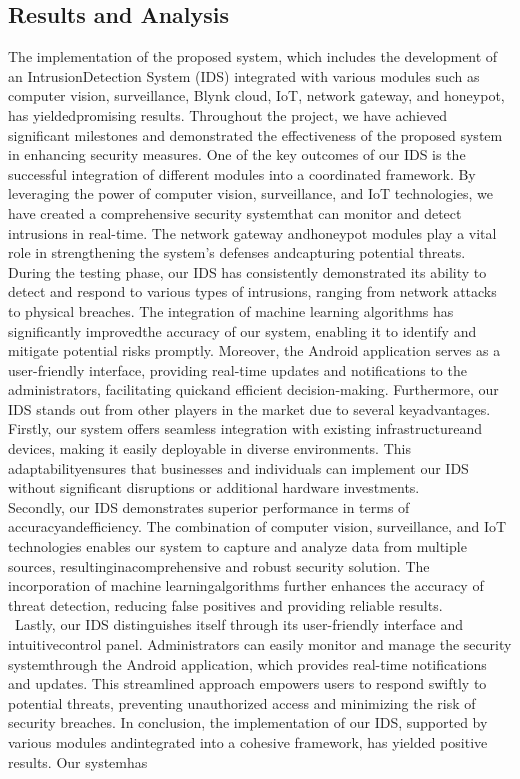 \documentclass[letterpaper, 10 pt, conference]{ieeeconf}  %
\begin{document}
\subsection{Results and Analysis}
The implementation of the proposed system, which includes the development of an IntrusionDetection System (IDS) integrated with various modules such as computer vision, surveillance, Blynk cloud, IoT, network gateway, and honeypot, has yieldedpromising results. Throughout the project, we have achieved significant milestones
and demonstrated the effectiveness of the proposed system in enhancing security measures. One of the key outcomes of our IDS is the successful integration of different
modules into a coordinated framework. By leveraging the power of computer vision, surveillance, and IoT technologies, we have created a comprehensive security systemthat can monitor and detect intrusions in real-time. The network gateway andhoneypot modules play a vital role in strengthening the system's defenses andcapturing potential threats. During the testing phase, our IDS has consistently demonstrated its ability to detect
and respond to various types of intrusions, ranging from network attacks to physical
breaches. The integration of machine learning algorithms has significantly improvedthe accuracy of our system, enabling it to identify and mitigate potential risks
promptly. Moreover, the Android application serves as a user-friendly interface, providing real-time updates and notifications to the administrators, facilitating quickand efficient decision-making. Furthermore, our IDS stands out from other players in the market due to several keyadvantages.\\ Firstly, our system offers seamless integration with existing infrastructureand devices, making it easily deployable in diverse environments. This adaptabilityensures that businesses and individuals can implement our IDS without significant
disruptions or additional hardware investments.\\ Secondly, our IDS demonstrates superior performance in terms of accuracyandefficiency. The combination of computer vision, surveillance, and IoT technologies
enables our system to capture and analyze data from multiple sources, resultinginacomprehensive and robust security solution. The incorporation of machine learningalgorithms further enhances the accuracy of threat detection, reducing false positives
and providing reliable results. \\ \
Lastly, our IDS distinguishes itself through its user-friendly interface and intuitivecontrol panel. Administrators can easily monitor and manage the security systemthrough the Android application, which provides real-time notifications and updates. This streamlined approach empowers users to respond swiftly to potential threats, preventing unauthorized access and minimizing the risk of security breaches. In conclusion, the implementation of our IDS, supported by various modules andintegrated into a cohesive framework, has yielded positive results. Our systemhas
\end{document}
